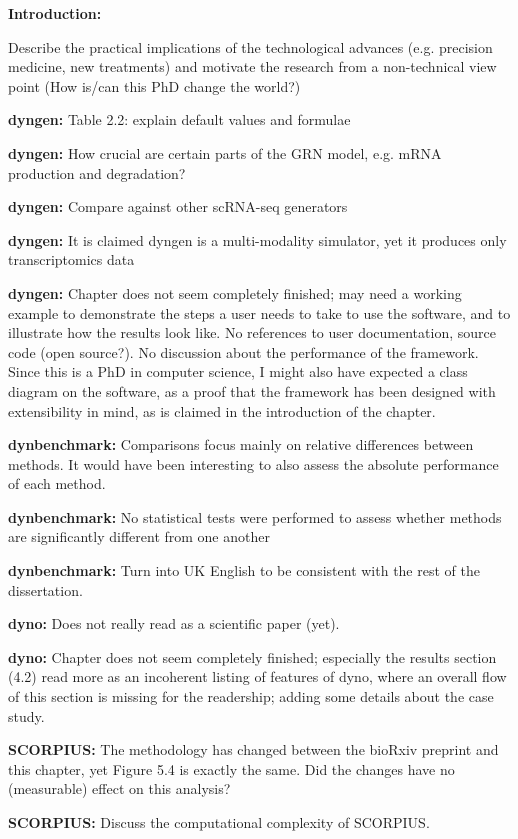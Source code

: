 \documentclass[10pt]{article}
\begin{document}
\textbf{Introduction:} {Describe the practical implications of the
		technological advances (e.g. precision medicine, new treatments) and
		motivate the research from a non-technical view point (How is/can this PhD
		change the world?)
	
\textbf{dyngen:} {Table 2.2: explain default values and formulae}

\textbf{dyngen:} {How crucial are certain parts of the GRN model, e.g. mRNA production and degradation?}

\textbf{dyngen:} {Compare against other scRNA-seq generators}

\textbf{dyngen:} {It is claimed dyngen is a multi-modality simulator, yet it produces only transcriptomics data}

\textbf{dyngen:} Chapter does not seem completely finished; may need a working example to demonstrate the steps a user needs to take to use the software, and to illustrate how the results look like. No references to user documentation, source code (open source?). No discussion about the performance of the framework. Since this is a PhD in
computer science, I might also have expected a class diagram on the software, as a proof that the framework has been designed with extensibility in mind, as is claimed in the introduction of the chapter. 

\textbf{dynbenchmark:} {Comparisons focus mainly on relative differences between methods. It would have been interesting to also assess the absolute performance of each method.}

\textbf{dynbenchmark:} {No statistical tests were performed to assess whether methods are significantly different from one another}

\textbf{dynbenchmark:} Turn into UK English to be consistent with the rest of the dissertation.

\textbf{dyno:} {Does not really read as a scientific paper (yet).}

\textbf{dyno:} Chapter does not seem completely finished; especially the results section (4.2) read more as an incoherent listing of features of dyno, where an overall flow of this section is missing for the readership; adding some details about the case study.

\textbf{SCORPIUS:} {The methodology has changed between the bioRxiv preprint and this chapter, yet Figure 5.4 is exactly the same. Did the changes have no (measurable) effect on this analysis?}

\textbf{SCORPIUS:} {Discuss the computational complexity of SCORPIUS.}

}
\end{document}
